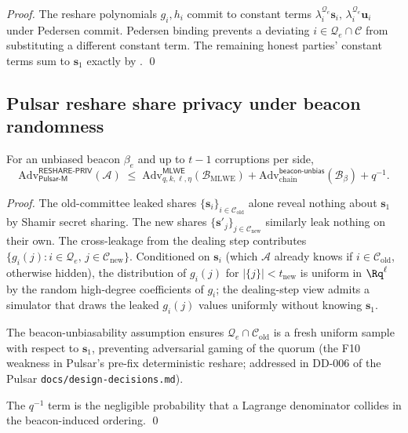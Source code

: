 \begin{proof}
The reshare polynomials $g_i, h_i$ commit to constant terms
$\lambda_i^{\mathcal{Q}_e} \mathbf{s}_i,\,
\lambda_i^{\mathcal{Q}_e} \mathbf{u}_i$ under Pedersen commit.
Pedersen binding prevents a deviating $i \in \mathcal{Q}_e \cap
\mathcal{C}$ from substituting a different constant term. The
remaining honest parties' constant terms sum to $\mathbf{s}_1$
exactly by . \qed
\end{proof}

\subsection*{Pulsar reshare share privacy under beacon randomness}

\begin{theorem}
\label{thm:pulsar-reshare-priv}
For an unbiased beacon $\beta_e$ and up to $t-1$ corruptions per
side,
\[
  \mathrm{Adv}^{\mathsf{RESHARE\text{-}PRIV}}_{\mathsf{Pulsar\text{-}M}}(\mathcal{A})
  \;\le\;
  \mathrm{Adv}^{\mathsf{MLWE}}_{q, k, \ell, \eta}(\mathcal{B}_{\mathrm{MLWE}})
  + \mathrm{Adv}^{\mathsf{beacon\text{-}unbias}}_{\mathrm{chain}}(\mathcal{B}_{\beta})
  + q^{-1}.
\]
\end{theorem}

\begin{proof}
The old-committee leaked shares $\{\mathbf{s}_i\}_{i \in
\mathcal{C}_{\mathrm{old}}}$ alone reveal nothing about
$\mathbf{s}_1$ by Shamir secret sharing. The new shares
$\{\mathbf{s}'_j\}_{j \in \mathcal{C}_{\mathrm{new}}}$ similarly
leak nothing on their own. The cross-leakage from the dealing step
contributes $\{g_i(j) : i \in \mathcal{Q}_e,\, j \in
\mathcal{C}_{\mathrm{new}}\}$. Conditioned on $\mathbf{s}_i$ (which
$\mathcal{A}$ already knows if $i \in \mathcal{C}_{\mathrm{old}}$,
otherwise hidden), the distribution of $g_i(j)$ for $|\{j\}| <
t_{\mathrm{new}}$ is uniform in $\Rq^\ell$ by the random high-degree
coefficients of $g_i$; the dealing-step view admits a simulator
that draws the leaked $g_i(j)$ values uniformly without knowing
$\mathbf{s}_1$.

The beacon-unbiasability assumption ensures
$\mathcal{Q}_e \cap \mathcal{C}_{\mathrm{old}}$ is a fresh uniform
sample with respect to $\mathbf{s}_1$, preventing adversarial
gaming of the quorum (the F10 weakness in Pulsar's pre-fix
deterministic reshare; addressed in DD-006 of the Pulsar
\texttt{docs/design-decisions.md}).

The $q^{-1}$ term is the negligible probability that a Lagrange
denominator collides in the beacon-induced ordering. \qed
\end{proof}

